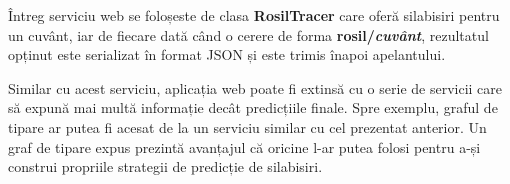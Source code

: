 Întreg serviciu web se foloșeste de clasa \textbf{RosilTracer} care oferă silabisiri pentru un cuvânt, iar de fiecare dată când o cerere de forma \textbf{rosil/\textit{cuvânt}}, rezultatul opținut este serializat în format JSON și este trimis înapoi apelantului.

Similar cu acest serviciu, aplicația web poate fi extinsă cu o serie de servicii care să expună mai multă informație decât predicțiile finale. Spre exemplu, graful de tipare ar putea fi acesat de la un serviciu similar cu cel prezentat anterior. Un graf de tipare expus prezintă avanțajul că oricine l-ar putea folosi pentru a-și construi propriile strategii de predicție de silabisiri. 